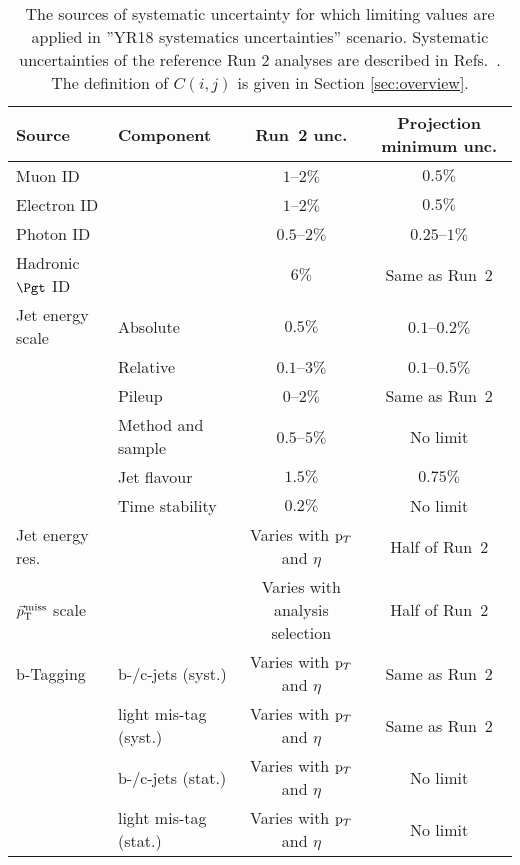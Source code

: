 \begin{table}[hbtp]
\footnotesize
\centering
\caption{The sources of systematic uncertainty for which limiting values are applied in ''YR18 systematics uncertainties'' scenario.
Systematic uncertainties of the reference Run 2 analyses are described in Refs.~\cite{Sirunyan:2018mbx,Sirunyan:2018pzn,Khachatryan:2015wka,Sirunyan:2017xzt}. The definition of $C(i,j)$ is given in Section \ref{sec:overview}.}

\begin{tabular}{@{} l p{3cm} c c @{}}
Source       &   Component         & Run~2 unc.             & Projection minimum unc. \\
\hline
Muon ID   &           & $1$--$2\%$            & $0.5\%$        \\
Electron ID &           & $1$--$2\%$            & $0.5\%$        \\
Photon ID   &           & $0.5$--$2\%$            & $0.25$--$1\%$    \\
Hadronic $\Pgt$ ID &         & $6\%$               & Same as Run~2    \\
Jet energy scale &  Absolute    & $0.5\%$               & $0.1$--$0.2\%$   \\
         &  Relative    & $0.1$--$3\%$            & $0.1$--$0.5\%$   \\
         &  Pileup      & $0$--$2\%$            & Same as Run~2  \\
         &  Method and sample & $0.5$--$5\%$          & No limit     \\
         &  Jet flavour       & $1.5\%$             & $0.75\%$     \\
         &  Time stability      & $0.2\%$             & No limit     \\
Jet energy res.   &     & Varies with $\mathrm{p}_{T}$ and $\eta$      & Half of Run~2   \\
${\vec p}_{\mathrm{T}}^{\kern1pt\text{miss}}$ scale       &     & Varies with analysis selection        & Half of Run~2   \\
b-Tagging   & b-/c-jets (syst.)       & Varies with $\mathrm{p}_{T}$ and $\eta$    & Same as Run~2\\
          & light mis-tag (syst.)   & Varies with $\mathrm{p}_{T}$ and $\eta$       & Same as Run~2      \\
           & b-/c-jets (stat.)    & Varies with $\mathrm{p}_{T}$ and $\eta$       & No limit        \\
          & light mis-tag (stat.)   & Varies with $\mathrm{p}_{T}$ and $\eta$       & No limit           \\

\end{tabular}
\end{table}
